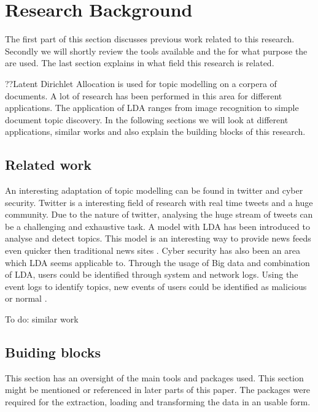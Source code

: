 \chapter{Research Background}  \label{ch:theory}

\begin{comment}
\section{definitions}
\end{comment}

The first part of this section discusses previous work related to this research. Secondly we will shortly review the tools available and the for what purpose the are used. The last section explains in what field this research is related.

??Latent Dirichlet Allocation is used for topic modelling on a corpera of documents. A lot of research has been performed in this area for different applications. The application of LDA ranges from image recognition to simple document topic discovery. 
In the following sections we will look at different applications, similar works and also explain the building blocks of this research.

\section{Related work} 
An interesting adaptation of topic modelling can be found in twitter and cyber security. Twitter is a interesting field of research with real time tweets and a huge community. Due to the nature of twitter, analysing the huge stream of tweets can be a challenging and exhaustive task. A model with LDA has been introduced to analyse and detect topics. This model is an interesting way to provide news feeds even quicker then traditional news sites \cite{Zhao2011ComparingModels}. Cyber security has also been an area which LDA seems applicable to. Through the usage of Big data and combination of LDA, users could be identified through system and network logs. Using the event logs to identify topics, new events of users could be identified as malicious or normal \cite{Jingwei2014KnowledgeLDA}. 

To do: similar work 



\section{Buiding blocks}
This section has an oversight of the main tools and packages used. This section might be mentioned or referenced in later parts of this paper. The packages were required for the extraction, loading and transforming the data in an usable form.

